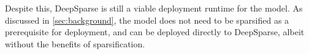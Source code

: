Despite this, DeepSparse \cite{deepsparse} is still a viable deployment runtime for the model. As discussed in \autoref{sec:background}, the model does not need to be sparsified as a prerequisite for deployment, and can be deployed directly to DeepSparse, albeit without the benefits of sparsification.

